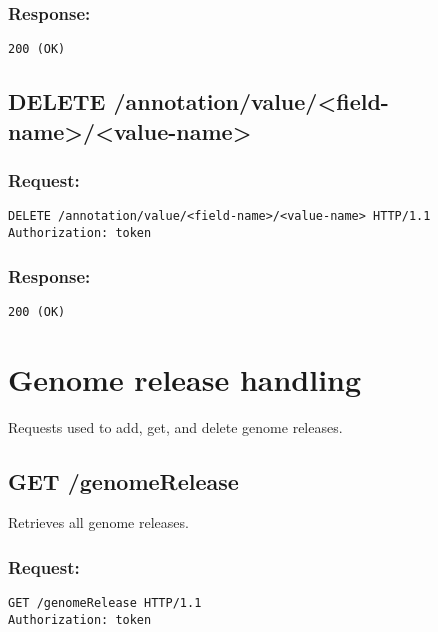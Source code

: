 \subsubsection*{Response:}
\begin{verbatim}
200 (OK)
\end{verbatim}

\subsection*{DELETE /annotation/value/<field-name>/<value-name>}

\subsubsection*{Request:}
\begin{verbatim}
DELETE /annotation/value/<field-name>/<value-name> HTTP/1.1
Authorization: token
\end{verbatim}

\subsubsection*{Response:}
\begin{verbatim}
200 (OK)
\end{verbatim}

\section*{Genome release handling}

Requests used to add, get, and delete genome releases.

\subsection*{GET /genomeRelease}

Retrieves all genome releases.

\subsubsection*{Request:}
\begin{verbatim}
GET /genomeRelease HTTP/1.1
Authorization: token
\end{verbatim}

